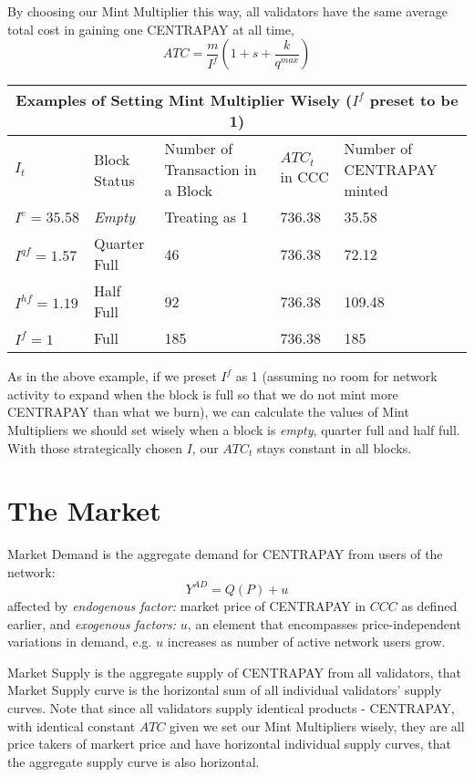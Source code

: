 \documentclass{article}
\begin{document}
By choosing our Mint Multiplier this way, all validators have the same average total cost in gaining one CENTRAPAY at all time,
$$ATC= \frac{m}{I^f} (1+s+ \frac{k}{q^{max}})$$


\begin{tabular}{ |p{1.7cm}|p{2cm}|p{2cm}|p{1.1cm}|p{2.3cm}|}
 \hline
 \multicolumn{5}{|c|}{Examples of Setting Mint Multiplier Wisely ($I^f$ preset to be 1)} \\
 \hline
$I_t$&Block Status&Number of Transaction in a Block&$ATC_t$ in CCC &Number of CENTRAPAY minted\\
 \hline
$I^e=35.58$   &\textit{Empty}     &Treating as 1      &736.38   &35.58\\
$I^{qf}=1.57$   &Quarter Full   &46     &736.38   &72.12\\
$I^{hf}=1.19$   &Half Full  &92     &736.38   &109.48\\
$I^f=1$   &Full   &185    &736.38   &185\\
 \hline
\end{tabular}

As in the above example, if we preset $I^f$ as 1 (assuming no room for network activity to expand when the block is full so that we do not mint more CENTRAPAY than what we burn), we can calculate the values of Mint Multipliers we should set wisely when a block is \textit{empty}, quarter full and half full. With those strategically chosen $I$, our $ATC_t$ stays constant in all blocks.   

\section{The Market}
Market Demand is the aggregate demand for CENTRAPAY from users of the network: $$Y^{AD}=Q(P)+u$$ affected by \textit{endogenous factor:} market price of CENTRAPAY in $CCC$ as defined earlier, and \textit{exogenous factors:} $u$, an element that encompasses price-independent variations in demand, e.g. $u$ increases as number of active network users grow. \par

Market Supply is the aggregate supply of CENTRAPAY from all validators, that Market Supply curve is the horizontal sum of all individual validators’ supply curves. Note that since all validators supply identical products - CENTRAPAY, with identical constant $ATC$ given we set our Mint Multipliers wisely, they are all price takers of markert price and have horizontal individual supply curves, that the aggregate supply curve is also horizontal. 
\end{document}
